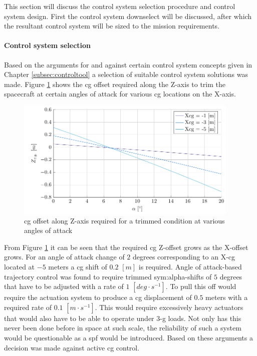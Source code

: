 This section will discuss the control system selection procedure and control system design. First the control system downselect will be discussed, after which the resultant control system will be sized to the mission requirements.
\paragraph{Control system selection}
Based on the arguments for and against certain control system concepts given in Chapter \ref{subsec:controltool} a selection of suitable control system solutions was made. Figure \ref{fig:cgoffset} shows the \gls{cg} offset required along the Z-axis to trim the spacecraft at certain angles of attack for various \gls{cg} locations on the X-axis. 
\begin{figure}[ht]
	\centering
	\includegraphics[width=0.95\textwidth]{./Figure/control/moment}
	\caption[\acrlong{cg} offset along Z-axis required for a trimmed condition at various angles of attack]{\gls{cg} offset along Z-axis required for a trimmed condition at various angles of attack}
	\label{fig:cgoffset}
\end{figure}
From Figure \ref{fig:cgoffset} it can be seen that the required \gls{cg} Z-offset grows as the X-offset grows. For an angle of attack change of $2$ degrees corresponding to an X-\gls{cg} located at $-5$ meters a \gls{cg} shift of $0.2$ $[m]$ is required. Angle of attack-based trajectory control was found to require trimmed \gls{sym:alpha}-shifts of $5$ degrees that have to be adjusted with a rate of $1$ $[deg \cdot s^{-1}]$. To pull this off would require the actuation system to produce a \gls{cg} displacement of $0.5$ meters with a required rate of $0.1$ $[m \cdot s^{-1}]$. This would require excessively heavy actuators that would also have to be able to operate under 3-g loads. Not only has this never been done before in space at such scale, the reliability of such a system would be questionable as a \gls{spf} would be introduced. Based on these arguments a decision was made against active \gls{cg} control.\\
